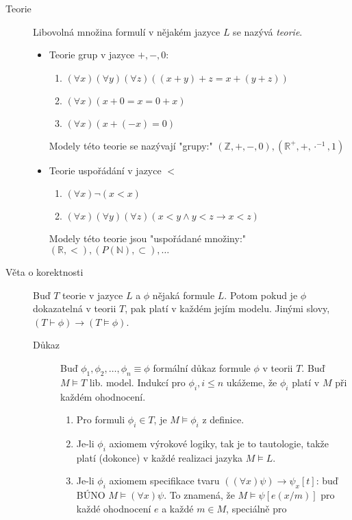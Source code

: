 \documentclass[a4paper]{article}
\begin{document}
\begin{description}
		\item[Teorie] Libovolná množina formulí v nějakém jazyce $L$ se nazývá \textit{teorie}.
			\begin{itemize}
				\item Teorie grup v jazyce $+, -, 0$:
					\begin{enumerate}
						\item $(\forall x)(\forall y)(\forall z) ((x + y) + z = x + (y + z))$
						\item $(\forall x) (x + 0 = x = 0 + x)$ 
						\item $(\forall x) (x + (-x) = 0)$
					\end{enumerate}
					Modely této teorie se nazývají "grupy:"
					$(\mathbb{Z}, +, -, 0), (\mathbb{R}^+, +, \cdot^{-1}, 1)$
				\item Teorie uspořádání v jazyce $<$
					 \begin{enumerate}
						 \item $(\forall x) \neg (x < x)$
						 \item $(\forall x)(\forall y)(\forall z) (x < y \land y < z \to x < z)$
					\end{enumerate}
					Modely této teorie jsou "uspořádané množiny:"
					$(\mathbb{R}, <), (P(\mathbb{N}), \subset), \ldots$
			\end{itemize}
		\item[Věta o korektnosti] Buď $T$ teorie v jazyce $L$ a $\phi$ nějaká formule $L$.
			Potom pokud je $\phi$ dokazatelná v teorii $T$, pak platí v každém jejím modelu.
			Jinými slovy, $(T \vdash \phi) \to (T \models \phi)$.
			\begin{description}
				\item[Důkaz] Buď $\phi_1, \phi_2, \ldots, \phi_n \equiv \phi$ formální důkaz formule
					$\phi$ v teorii $T$. Buď $M \models T$ lib. model.
					Indukcí pro $\phi_i, i \le n$ ukážeme, že $\phi_i$ platí v $M$ při
					každém ohodnocení.
					\begin{enumerate}
						\item Pro formuli $\phi_i \in T$, je $M \models \phi_i$ z definice. 
						\item Je-li $\phi_i$ axiomem výrokové logiky, tak je to tautologie,
							takže platí (dokonce) v každé realizaci jazyka $M \models L$.
						\item Je-li $\phi_i$ axiomem specifikace tvaru
							$((\forall x) \psi) \to \psi_x[t]$: buď BÚNO
							$M \models (\forall x) \psi$. To znamená, že $M \models \psi[e(x/m)]$ 
							pro každé ohodnocení $e$ a každé $m \in M$, speciálně pro

\end{enumerate}
\end{description}
\end{description}
\end{document}
